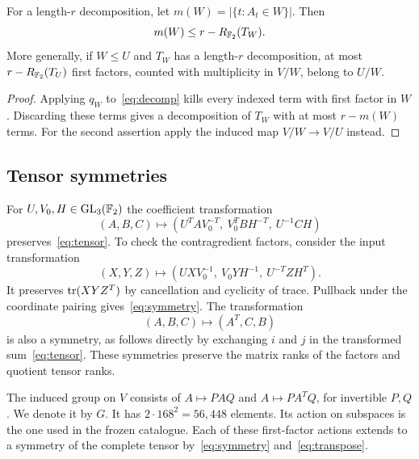 \begin{lemma}\label{lem:occupation}
For a length-$r$ decomposition, let
$m(W)=|\{t:A_t\in W\}|$. Then
\begin{equation}\label{eq:occupation}
 m(W)\leq r-R_{\mathbb F_2}(T_W).
\end{equation}
More generally, if $W\leq U$ and $T_W$ has a length-$r$
decomposition, at most $r-R_{\mathbb F_2}(T_U)$ first factors, counted with
multiplicity in $V/W$, belong to $U/W$.
\end{lemma}
\begin{proof}
Applying $q_W$ to~\eqref{eq:decomp} kills every indexed term
with first factor in $W$. Discarding these terms gives a decomposition
of $T_W$ with at most $r-m(W)$ terms. For the
second assertion apply the induced map $V/W\to V/U$ instead.
\end{proof}

\subsection{Tensor symmetries}
For $U,V_0,H\in\operatorname{GL}_3(\mathbb F_2)$ the coefficient transformation
\begin{equation}\label{eq:symmetry}
 (A,B,C)\longmapsto
 (U^TAV_0^{-T},\ V_0^TBH^{-T},\ U^{-1}CH)
\end{equation}
preserves~\eqref{eq:tensor}. To check the contragredient factors,
consider the input transformation
\[
 (X,Y,Z)\longmapsto
 (UXV_0^{-1},\ V_0YH^{-1},\ U^{-T}ZH^T).
\]
It preserves $\operatorname{tr}(XYZ^T)$ by cancellation and cyclicity of trace.
Pullback under the coordinate pairing gives~\eqref{eq:symmetry}.
The transformation
\begin{equation}\label{eq:transpose}
 (A,B,C)\longmapsto(A^T,C,B)
\end{equation}
is also a symmetry, as follows directly by exchanging $i$ and $j$ in
the transformed sum~\eqref{eq:tensor}. These symmetries preserve the
matrix ranks of the factors and quotient tensor ranks.

The induced group on $V$ consists of $A\mapsto PAQ$ and
$A\mapsto PA^TQ$, for invertible $P,Q$. We denote it by $G$.
It has $2\cdot168^2=56{,}448$ elements. Its action on subspaces is the
one used in the frozen catalogue. Each of these first-factor actions
extends to a symmetry of the complete tensor by~\eqref{eq:symmetry}
and~\eqref{eq:transpose}.
